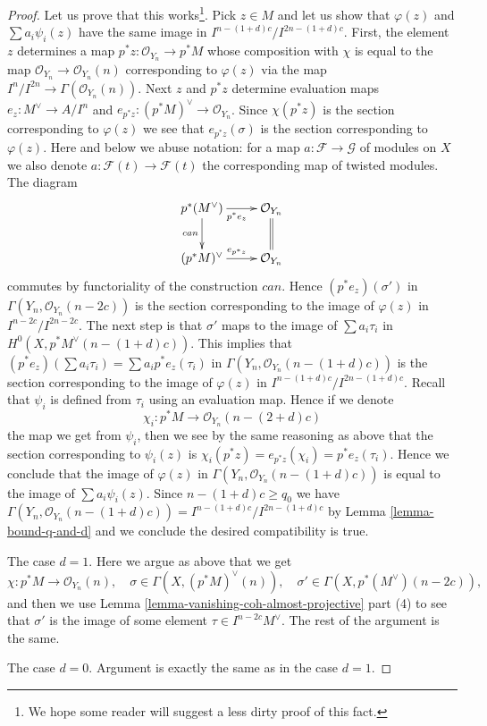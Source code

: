 \documentclass[10pt,a4paper]{amsart}
\theoremstyle{plain}
\theoremstyle{definition}
\theoremstyle{remark}
\numberwithin{equation}{subsection}
\begin{document}
\begin{proof}
\medskip\noindent
Let us prove that this works\footnote{We hope some reader will suggest
a less dirty proof of this fact.}. Pick $z \in M$ and let us show that
$\varphi(z)$ and $\sum a_i \psi_i(z)$ have the same image in
$I^{n - (1 + d)c}/I^{2n - (1 + d)c}$.
First, the element $z$ determines a map
$p^*z : \mathcal{O}_{Y_n} \to p^*M$ whose composition with
$\chi$ is equal to the map $\mathcal{O}_{Y_n} \to \mathcal{O}_{Y_n}(n)$
corresponding to $\varphi(z)$ via the map
$I^n/I^{2n} \to \Gamma(\mathcal{O}_{Y_n}(n))$.
Next $z$ and $p^*z$ determine evaluation maps
$e_z : M^\vee \to A/I^n$ and $e_{p^*z} : (p^*M)^\vee \to \mathcal{O}_{Y_n}$.
Since $\chi(p^*z)$ is the section corresponding to $\varphi(z)$
we see that $e_{p^*z}(\sigma)$ is the section corresponding to $\varphi(z)$.
Here and below we abuse notation: for a map
$a : \mathcal{F} \to \mathcal{G}$ of modules on $X$
we also denote $a : \mathcal{F}(t) \to \mathcal{F}(t)$ the corresponding
map of twisted modules. The diagram
$$
\xymatrix{
p^*(M^\vee) \ar[d]_{can} \ar[r]_{p^*e_z} & \mathcal{O}_{Y_n} \ar@{=}[d] \\
(p^*M)^\vee \ar[r]^{e_{p^*z}} & \mathcal{O}_{Y_n}
}
$$
commutes by functoriality of the construction $can$. Hence
$(p^*e_z)(\sigma')$ in $\Gamma(Y_n, \mathcal{O}_{Y_n}(n - 2c))$
is the section corresponding to the image of $\varphi(z)$
in $I^{n - 2c}/I^{2n - 2c}$.
The next step is that $\sigma'$ maps to the image
of $\sum a_i \tau_i$ in $H^0(X, p^*M^\vee(n - (1 + d)c))$.
This implies that $(p^*e_z)(\sum a_i \tau_i) = \sum a_i p^*e_z(\tau_i)$
in $\Gamma(Y_n, \mathcal{O}_{Y_n}(n - (1 + d)c))$ is the section corresponding
to the image of $\varphi(z)$ in $I^{n - (1 + d)c}/I^{2n - (1 + d)c}$.
Recall that $\psi_i$ is defined from $\tau_i$ using an evaluation
map. Hence if we denote
$$
\chi_i : p^*M \longrightarrow \mathcal{O}_{Y_n}(n - (2 + d)c)
$$
the map we get from $\psi_i$, then we see by the same reasoning
as above that the section corresponding to $\psi_i(z)$ is
$\chi_i(p^*z) = e_{p^*z}(\chi_i) = p^*e_z(\tau_i)$. Hence we conclude that
the image of $\varphi(z)$ in $\Gamma(Y_n, \mathcal{O}_{Y_n}(n - (1 + d)c))$
is equal to the image of $\sum a_i\psi_i(z)$.
Since $n - (1 + d)c \geq q_0$ we have
$\Gamma(Y_n, \mathcal{O}_{Y_n}(n - (1 + d)c)) =
I^{n - (1 + d)c}/I^{2n - (1 + d)c}$ by Lemma \ref{lemma-bound-q-and-d} and
we conclude the desired compatibility is true.

\medskip\noindent
The case $d = 1$. Here we argue as above that we get
$$
\chi : p^*M \longrightarrow \mathcal{O}_{Y_n}(n),\quad
\sigma \in \Gamma(X, (p^*M)^\vee(n)),\quad
\sigma' \in \Gamma(X, p^*(M^\vee)(n - 2c)),
$$
and then we use
Lemma \ref{lemma-vanishing-coh-almost-projective} part (4)
to see that $\sigma'$ is the image of some element
$\tau \in I^{n - 2c}M^\vee$. The rest of the argument is the same.

\medskip\noindent
The case $d = 0$. Argument is exactly the same as in the
case $d = 1$.
\end{proof}
\end{document}
